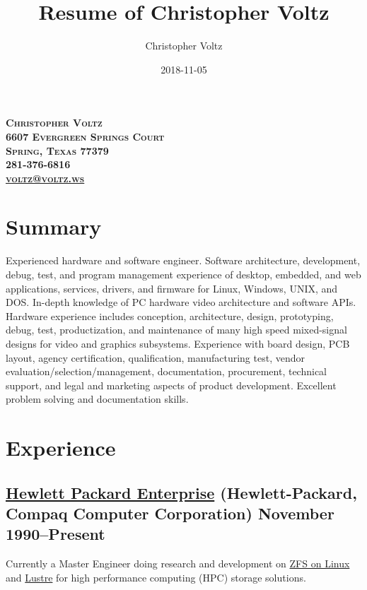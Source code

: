 \documentclass[10pt,letterpaper,oneside]{report}
\title{Resume of Christopher Voltz}
\author{Christopher Voltz}
\date{2018-11-05}
\begin{document}
\begin{center}
  \textbf{
    \textsc{
      Christopher Voltz\\
      6607 Evergreen Springs Court\\
      Spring, Texas 77379\\
      281-376-6816\\
      \href{mailto:voltz@voltz.ws?subject=Resume}{voltz@voltz.ws}
    }
  }
\end{center}

\section{Summary}

Experienced hardware and software engineer. Software architecture, development,
debug, test, and program management experience of desktop, embedded, and web
applications, services, drivers, and firmware for Linux, Windows, UNIX, and DOS.
In-depth knowledge of PC hardware video architecture and software APIs.
Hardware experience includes conception, architecture, design, prototyping,
debug, test, productization, and maintenance of many high speed mixed-signal
designs for video and graphics subsystems. Experience with board design, PCB
layout, agency certification, qualification, manufacturing test, vendor
evaluation/selection/management, documentation, procurement, technical support,
and legal and marketing aspects of product development. Excellent problem
solving and documentation skills.

\section{Experience}

\subsection[Hewlett Packard Enterprise]{
  \href{http://www.hpe.com/}{Hewlett Packard Enterprise}
  {\footnotesize (Hewlett-Packard, Compaq Computer Corporation)}
  \hfill November 1990--Present
}

\vspace{-1.5ex}

Currently a Master Engineer doing research and development on
{\href{https://zfsonlinux.org/}{ZFS on Linux}} and
{\href{http://lustre.org/}{Lustre}} for high performance computing (HPC) storage
solutions.
\end{document}
